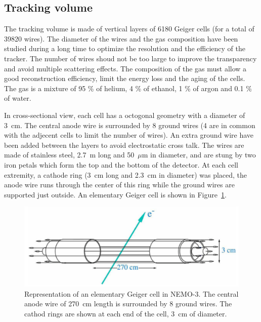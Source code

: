 \documentclass[main.tex]{subfiles}
\begin{document}
\subsection{Tracking volume}


\NI The tracking volume is made of vertical layers of 6180 Geiger cells (for a total of 39820 wires). The diameter of the wires and the gas composition have been studied during a long time to optimize the resolution and the efficiency of the tracker. The number of wires shoud not be too large to improve the transparency and avoid multiple scattering effects. The composition of the gas must allow a good reconstruction efficiency, limit the energy loss and the aging of the cells. The gas is a mixture of 95 \% of helium, 4 \% of ethanol, 1 \% of argon and 0.1 \% of water. 


\bigskip


\NI In cross-sectional view, each cell has a octogonal geometry with a diameter of 3~cm. The central anode wire is surrounded by 8 ground wires (4 are in common with the adjecent cells to limit the number of wires). An extra ground wire have been added between the layers to avoid electrostatic cross talk. The wires are made of stainless steel, 2.7~m long and 50~$\mu$m in diameter, and are stung by two iron petals which form the top and the bottom of the detector. At each cell extremity, a  cathode ring (3~cm long and 2.3~cm in diameter) was placed, the anode wire runs through the center of this
ring while the ground wires are supported just outside. An elementary Geiger cell is shown in Figure~\ref{GeigerCellNEMO3}.


\begin{figure}[h!]
\begin{center}
\includegraphics[scale=0.3]{pictures/Chap3/GeigerCellNEMO3.png}
\caption{Representation of an elementary Geiger cell in NEMO-3. The central anode wire of 270~cm length is surrounded by 8 ground wires. The cathod rings are shown at each end of the cell, 3~cm of diameter.}
\label{GeigerCellNEMO3}
\end{center}
\end{figure}
\end{document}
